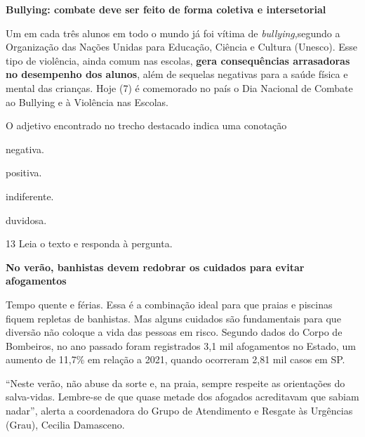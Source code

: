 \begin{myquote}
\textbf{Bullying: combate deve ser feito de forma coletiva e intersetorial}

Um em cada três alunos em todo o mundo já foi vítima de
\textit{bullying},segundo a Organização das Nações Unidas para Educação,
Ciência e Cultura (Unesco). Esse tipo de violência, ainda comum nas
escolas, \textbf{gera consequências arrasadoras no desempenho dos alunos},
além de sequelas negativas para a saúde física e mental das crianças.
Hoje (7) é comemorado no país o Dia Nacional de Combate ao Bullying e à
Violência nas Escolas.

\end{myquote}

O adjetivo encontrado no trecho destacado indica uma conotação

\begin{escolha}
  \item negativa.

  \item positiva.

  \item indiferente.

  \item duvidosa.
\end{escolha}


\num{13} Leia o texto e responda à pergunta.

\begin{myquote}
\textbf{No verão, banhistas devem redobrar os cuidados para evitar
afogamentos}

Tempo quente e férias. Essa é a combinação ideal para que praias e
piscinas fiquem repletas de banhistas. Mas alguns cuidados são
fundamentais para que diversão não coloque a vida das pessoas em risco.
Segundo dados do Corpo de Bombeiros, no ano passado foram registrados
3,1 mil afogamentos no Estado, um aumento de 11,7\% em relação a 2021,
quando ocorreram 2,81 mil casos em SP.

``Neste verão, não abuse da sorte e, na praia, sempre respeite as
orientações do salva-vidas. Lembre-se de que quase metade dos afogados
acreditavam que sabiam nadar'', alerta a coordenadora do Grupo de
Atendimento e Resgate às Urgências (Grau), Cecilia Damasceno.

\end{myquote}

